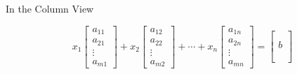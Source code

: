 \documentclass[10pt]{beamer}
\begin{document}
\begin{frame}{In the Column View}
\begin{itemize}
\begin{equation*}
      x_1 \begin{bmatrix} a_{11} \\ a_{21} \\ \vdots \\ a_{m1} \end{bmatrix}
    + x_2 \begin{bmatrix} a_{12} \\ a_{22} \\ \vdots \\ a_{m2} \end{bmatrix}
    + \cdots
    + x_n \begin{bmatrix} a_{1n} \\ a_{2n} \\ \vdots \\ a_{mn} \end{bmatrix}
    = \begin{bmatrix}\\ \\ b\\  \\ \\ \end{bmatrix}
\end{equation*}

\end{itemize}

\end{frame}
\end{document}
